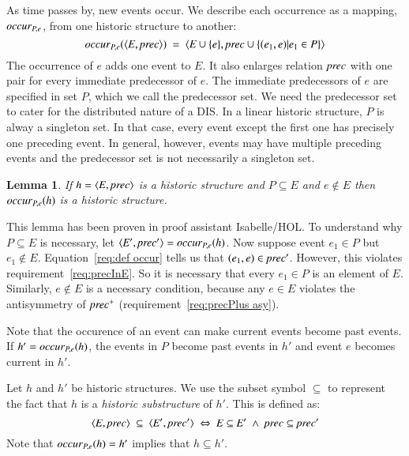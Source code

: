 \documentclass{elsarticle}
\newtheorem{lemma}{Lemma}
\def\id#1{\text{\em #1\/}}
\def\Events{{\mathit E}}
\begin{document}
	As time passes by, new events occur.
	We describe each occurrence as a mapping, $\id{occur}_{P,e}$, from one historic structure to another:
\begin{equation}
	\id{occur}_{P,e}(\la \Events, \id{prec}\ra)\ =\ \la \Events\cup\{e\}, \id{prec}\cup\{(e_1,e) | e_1\in P\}\ra
\label{req:def occur}
\end{equation}
	The occurrence of $e$ adds one event to $\Events$.
	It also enlarges relation $\id{prec}$ with one pair for every immediate predecessor of $e$.
	The immediate predecessors of $e$ are specified in set $P$, which we call the predecessor set.
	We need the predecessor set to cater for the distributed nature of a DIS.
	In a linear historic structure,
	$P$ is alway a singleton set.
	In that case, every event except the first one has precisely one preceding event.
	In general, however, events may have multiple preceding events and the predecessor set is not necessarily a singleton set.
\begin{lemma}
\label{lemma:occur preserves historic structure}
	If $h=\la \Events, \id{prec}\ra$ is a historic structure and $P\subseteq\Events$ and $e\notin\Events$
	then $\id{occur}_{P,e}(h)$ is a historic structure.
\end{lemma}
	This lemma has been proven in proof assistant Isabelle/HOL.
	To understand why $P\subseteq\Events$ is necessary,
	let $\la \Events', \id{prec}'\ra=\id{occur}_{P,e}(h)$.
	Now suppose event $e_1\in P$ but $e_1\notin\Events$.
	Equation~\ref{req:def occur} tells us that $(e_1,e)\in\id{prec}'$.
	However, this violates requirement~\ref{req:precInE}.
	So it is necessary that every $e_1\in P$ is an element of $\Events$.
	Similarly, $e\notin\Events$ is a necessary condition,
	because any $e\in\Events$ violates the antisymmetry of $\id{prec}^+$ (requirement~\ref{req:precPlus asy}).

	Note that the occurence of an event can make current events become past events.
	If $h'=\id{occur}_{P,e}(h)$, the events in $P$ become past events in $h'$ and event $e$ becomes current in $h'$.

	Let $h$ and $h'$ be historic structures.
	We use the subset symbol $\subseteq$ to represent the fact that $h$ is a {\em historic substructure} of $h'$.
	This is defined as:
\begin{equation}
\label{def:historic substructure}
	\la \Events, \id{prec}\ra\ \subseteq\ \la \Events', \id{prec}'\ra\ \Leftrightarrow\ \Events\subseteq\Events'\ \wedge\ \id{prec}\subseteq\id{prec}'
\end{equation}
	Note that $\id{occur}_{P,e}(h)=h'$ implies that $h\subseteq h'$.
\end{document}
